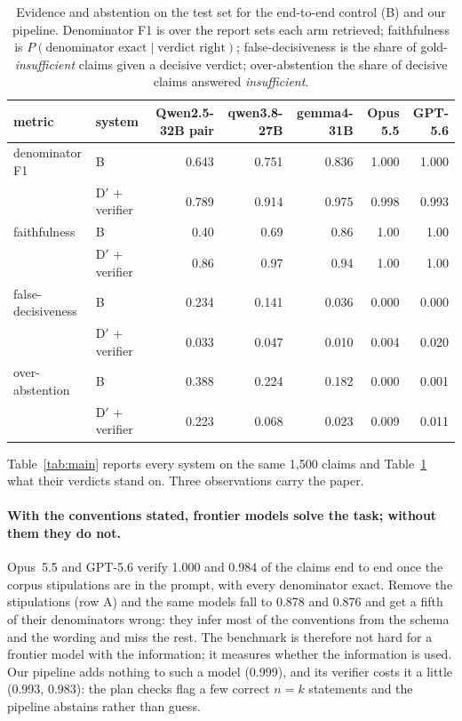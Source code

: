 \begin{table}[t]
\centering
\small
\setlength{\tabcolsep}{5pt}
\begin{tabular}{llrrrrr}
\toprule
metric & system & Qwen2.5-32B pair & qwen3.8-27B & gemma4-31B & Opus 5.5 & GPT-5.6 \\
\midrule
denominator F1 & B & 0.643 & 0.751 & 0.836 & 1.000 & 1.000 \\
 & D$'$ + verifier & 0.789 & 0.914 & 0.975 & 0.998 & 0.993 \\
faithfulness & B & 0.40 & 0.69 & 0.86 & 1.00 & 1.00 \\
 & D$'$ + verifier & 0.86 & 0.97 & 0.94 & 1.00 & 1.00 \\
false-decisiveness & B & 0.234 & 0.141 & 0.036 & 0.000 & 0.000 \\
 & D$'$ + verifier & 0.033 & 0.047 & 0.010 & 0.004 & 0.020 \\
over-abstention & B & 0.388 & 0.224 & 0.182 & 0.000 & 0.001 \\
 & D$'$ + verifier & 0.223 & 0.068 & 0.023 & 0.009 & 0.011 \\
\bottomrule
\end{tabular}
\caption{Evidence and abstention on the test set for the end-to-end control
(B) and our pipeline. Denominator F1 is over the report sets each arm
retrieved; faithfulness is $P(\text{denominator exact} \mid \text{verdict
right})$; false-decisiveness is the share of gold-\emph{insufficient} claims
given a decisive verdict; over-abstention the share of decisive claims
answered \emph{insufficient}.}
\label{tab:evidence}
\end{table}

Table~\ref{tab:main} reports every system on the same 1{,}500 claims and
Table~\ref{tab:evidence} what their verdicts stand on. Three observations
carry the paper.

\paragraph{With the conventions stated, frontier models solve the task;
without them they do not.} Opus~5.5 and GPT-5.6 verify 1.000 and 0.984 of the
claims end to end once the corpus stipulations are in the prompt, with every
denominator exact. Remove the stipulations (row A) and the same models fall to
0.878 and 0.876 and get a fifth of their denominators wrong: they infer most
of the conventions from the schema and the wording and miss the rest. The
benchmark is therefore not hard for a frontier model with the information; it
measures whether the information is used. Our pipeline adds nothing to such a
model (0.999), and its verifier costs it a little (0.993, 0.983): the plan
checks flag a few correct $n = k$ statements and the pipeline abstains rather
than guess.

